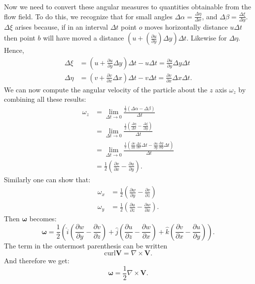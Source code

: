 Now we need to convert these angular measures to quantities obtainable from the flow field. To do this, we recognize that for small angles $\Delta \alpha = \frac{\Delta \eta}{\Delta x}$, and $\Delta \beta = \frac{\Delta\xi}{\Delta y}$. $\Delta \xi$ arises because, if in an interval $\Delta t$ point $o$ moves horizontally distance $u \Delta t$ then point $b$ will have moved a distance $\left( u + \left( \frac{\partial u}{\partial y} \right)\Delta y \right)\Delta t$. Likewise for $\Delta \eta$. Hence,
\begin{align*}
  \Delta \xi &=  \left( u + \frac{\partial u}{\partial y} \Delta y \right) \Delta t - u \Delta t = \frac{\partial u}{\partial y} \Delta y \Delta t \\
  \Delta \eta &= \left( v + \frac{\partial v}{\partial x}\Delta x \right) \Delta t - v \Delta t = \frac{\partial v}{\partial x} \Delta x \Delta t
.\end{align*}
We can now compute the angular velocity of the particle about the $z$ axis $\omega_z$ by combining all these results:
\begin{align*}
  \omega_z &= \lim_{\Delta t \to 0} \frac{\frac{1}{2} \left( \Delta \alpha - \Delta \beta \right)}{\Delta t} \\
  &= \lim_{\Delta t \to 0} \frac{\frac{1}{2} \left( \frac{\Delta \eta}{\Delta x} - \frac{\Delta \xi}{\Delta y}\right)}{\Delta t} \\
  &= \lim_{\Delta t \to 0} \frac{\frac{1}{2} \left( \frac{\partial v}{\partial x} \frac{\Delta x}{\Delta x} \Delta t - \frac{\partial u}{\partial y} \frac{\Delta y}{\Delta y} \Delta t \right)}{\Delta t} \\
  &= \frac{1}{2} \left( \frac{\partial v}{\partial x} - \frac{\partial u}{\partial y}  \right)
.\end{align*}
Similarly one can show that:
\begin{align*}
  \omega_x &= \frac{1}{2} \left( \frac{\partial w}{\partial y} - \frac{\partial v}{\partial z}  \right) \\
  \omega_y &= \frac{1}{2} \left( \frac{\partial u}{\partial z} - \frac{\partial w}{\partial x}  \right)
.\end{align*}
Then $\boldsymbol{\omega}$ becomes:
\[ 
  \boldsymbol{\omega} = \frac{1}{2} \left( \hat{i} \left( \frac{\partial w}{\partial y} - \frac{\partial v}{\partial z}  \right) + \hat{j} \left( \frac{\partial u}{\partial z} - \frac{\partial w}{\partial x}  \right) + \hat{k} \left( \frac{\partial v}{\partial x} - \frac{\partial u}{\partial y}  \right) \right)
.\]
The term in the outermost parenthesis can be written
\[ 
  \mathrm{curl} \textbf{V} = \nabla \times \textbf{V}
.\]
And therefore we get:
\[ 
  \boldsymbol{\omega} = \frac{1}{2} \nabla  \times \textbf{V}
.\]

